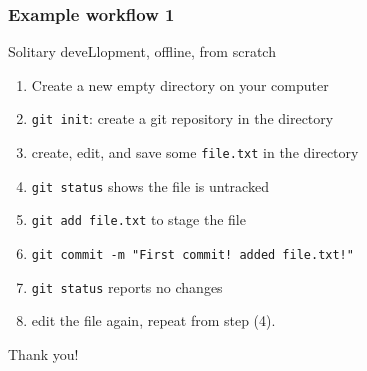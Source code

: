 \documentclass[10pt,svgnames,handout]{beamer}
\begin{document}
\begin{frame}
\frametitle{Example workflow 1}

\begin{block}{Solitary deveLlopment, offline, from scratch}
    
\begin{enumerate}
  \item Create a new empty directory on your computer
  \item \lstinline|git init|: create a git repository in the directory
  \item create, edit, and save some \texttt{file.txt} in the directory
  \item \lstinline|git status| shows the file is untracked
  \item \lstinline|git add file.txt| to stage the file
  \item \lstinline|git commit -m "First commit! added file.txt!"|
  \item \lstinline|git status| reports no changes
  \item edit the file again, repeat from step (4).
\end{enumerate}
\end{block}





\end{frame}




\begin{frame}[standout]
Thank you!
\end{frame}

\appendix
\end{document}
